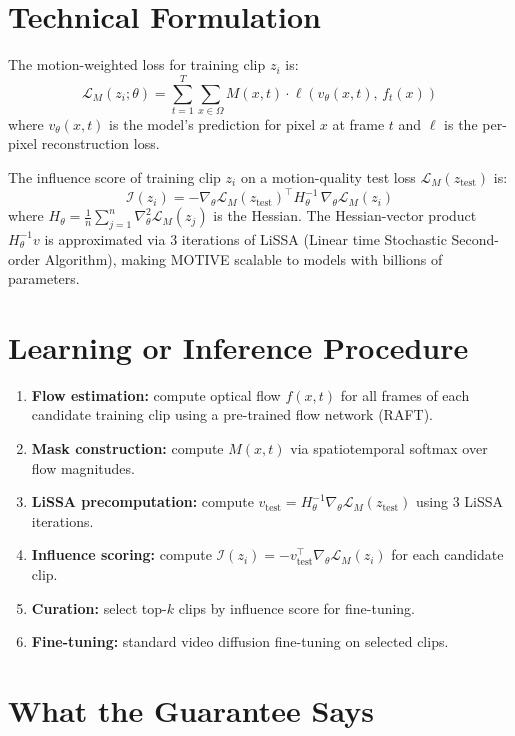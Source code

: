 \documentclass[10pt,twocolumn]{article}
\begin{document}
\section{Technical Formulation}

The motion-weighted loss for training clip $z_i$ is:
\[
\mathcal{L}_M(z_i;\theta) = \sum_{t=1}^{T}\sum_{x \in \Omega}
  M(x,t)\cdot\ell\!\left(v_\theta(x,t),\,f_t(x)\right)
\]
where $v_\theta(x,t)$ is the model's prediction for pixel $x$ at frame $t$
and $\ell$ is the per-pixel reconstruction loss.

The influence score of training clip $z_i$ on a motion-quality test loss $\mathcal{L}_M(z_\text{test})$ is:
\[
\mathcal{I}(z_i) = -\nabla_\theta \mathcal{L}_M(z_\text{test})^\top
  H_\theta^{-1}\,\nabla_\theta \mathcal{L}_M(z_i)
\]
where $H_\theta = \frac{1}{n}\sum_{j=1}^{n}\nabla^2_\theta\mathcal{L}_M(z_j)$
is the Hessian. The Hessian-vector product $H_\theta^{-1}v$ is approximated
via 3 iterations of LiSSA (Linear time Stochastic Second-order Algorithm),
making MOTIVE scalable to models with billions of parameters.

\section{Learning or Inference Procedure}

\begin{enumerate}[itemsep=2pt,parsep=0pt]
  \item \textbf{Flow estimation:} compute optical flow $f(x,t)$ for all frames
    of each candidate training clip using a pre-trained flow network (RAFT).
  \item \textbf{Mask construction:} compute $M(x,t)$ via spatiotemporal softmax
    over flow magnitudes.
  \item \textbf{LiSSA precomputation:} compute $v_\text{test} = H_\theta^{-1}\nabla_\theta\mathcal{L}_M(z_\text{test})$
    using 3 LiSSA iterations.
  \item \textbf{Influence scoring:} compute $\mathcal{I}(z_i) = -v_\text{test}^\top\nabla_\theta\mathcal{L}_M(z_i)$
    for each candidate clip.
  \item \textbf{Curation:} select top-$k$ clips by influence score for fine-tuning.
  \item \textbf{Fine-tuning:} standard video diffusion fine-tuning on selected clips.
\end{enumerate}

\section{What the Guarantee Says}
\end{document}
